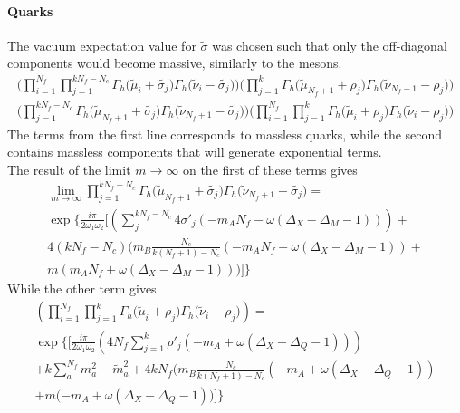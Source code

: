 \paragraph{Quarks}
The vacuum expectation value for $\tilde{\sigma}$ was chosen such that only the off-diagonal components would become massive, similarly to the mesons.
\begin{equation}
\begin{aligned}
\bigg( \prod_{i=1}^{N_f} \prod_{j=1}^{k N_f - N_c } \Gamma_h \big( \tilde \mu_i + \tilde{\sigma_j} \big) \Gamma_h \big( \tilde \nu_i - \tilde{\sigma_j} \big) \bigg)
\bigg(\prod_{j=1}^{k} \Gamma_h \big( \tilde \mu_{N_f+1} + \rho_j \big) \Gamma_h \big( \tilde \nu_{N_f+1} - \rho_j \big) \bigg)\\
\bigg( \prod_{j=1}^{k N_f - N_c}   \Gamma_h \big( \tilde \mu_{N_f+1} + \tilde{\sigma_j} \big) \Gamma_h \big( \tilde \nu_{N_f+1} - \tilde{\sigma_j} \big) \bigg)
\bigg( \prod_{i=1}^{N_f} \prod_{j=1}^{k } \Gamma_h \big( \tilde \mu_i + \rho_j \big) \Gamma_h \big( \tilde \nu_i - \rho_j \big) \bigg)
\end{aligned}
\end{equation}
The terms from the first line corresponds to massless quarks, while the second contains massless components that will generate exponential terms.\\
The result of the limit $ m \rightarrow \infty$ on the first of these terms gives 
\begin{multline}
\lim_{m \rightarrow \infty} \prod_{j=1}^{k N_f - N_c}   \Gamma_h \big(\tilde \mu_{N_f+1} + \tilde{\sigma_j} \big) \Gamma_h \big( \tilde \nu_{N_f+1} - \tilde{\sigma_j} \big) = \\ 
\exp
\biggl \{ \frac{i \pi}{2 \omega_1 \omega_2}
\biggl[ 
\left(
\sum_j^{k N_f - N_c} 4 \sigma'_j \left( - m_A N_f -  \omega( \Delta_X - \Delta_M - 1) \right)  \right) +  \\
4 (k N_f - N_c) \biggl(  m_B \frac{N_c}{k(N_f +1)- N_c}  \left(-  m_A N_f - \omega( \Delta_X - \Delta_M - 1)\right) + \\
 m \left(  m_A N_f + \omega( \Delta_X - \Delta_M - 1)\right)\biggr)
\biggr]
 \biggr\}
\end{multline}
While the other term gives 
\begin{multline}
\left( \prod_{i=1}^{N_f} \prod_{j=1}^{k } \Gamma_h \big( \tilde \mu_i + \rho_j \big) \Gamma_h \big( \tilde \nu_i - \rho_j \big) \right) 
= \\
\exp
\biggl \{ 
\biggr[
\frac{i \pi}{2 \omega_1 \omega_2}
\left( 4 N_f \sum_{j=1}^k  \rho'_j \left( - m_A +  \omega ( \Delta_X - \Delta_Q - 1) \right) \right) \\
+  k \sum_a^{N_f} m_a^2 - \tilde{m}_a^2 + 4 k N_f \biggl(  m_B \frac{N_c}{k(N_f +1)- N_c}  \left(- m_A +  \omega ( \Delta_X - \Delta_Q - 1)\right) \\
+ m ( - m_A +  \omega ( \Delta_X - \Delta_Q - 1)\biggr) 
\biggr]
\biggr\}
\end{multline}



